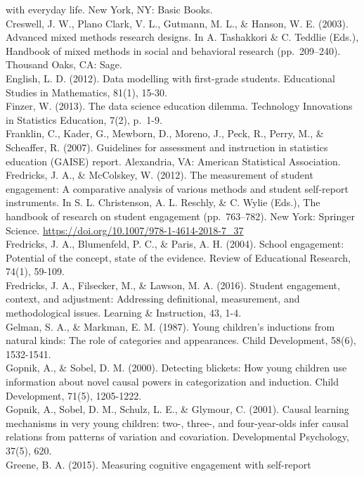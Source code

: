 \documentclass[]{msu-thesis}
\theoremstyle{definition}
\theoremstyle{definition}
\theoremstyle{definition}
\theoremstyle{remark}
\begin{document}
with everyday life. New York, NY: Basic Books.\\
Creswell, J. W., Plano Clark, V. L., Gutmann, M. L., \& Hanson, W. E.
(2003). Advanced mixed methods research designs. In A. Tashakkori \& C.
Teddlie (Eds.), Handbook of mixed methods in social and behavioral
research (pp.~209--240). Thousand Oaks, CA: Sage.\\
English, L. D. (2012). Data modelling with first-grade students.
Educational Studies in Mathematics, 81(1), 15-30.\\
Finzer, W. (2013). The data science education dilemma. Technology
Innovations in Statistics Education, 7(2), p.~1-9.\\
Franklin, C., Kader, G., Mewborn, D., Moreno, J., Peck, R., Perry, M.,
\& Scheaffer, R. (2007). Guidelines for assessment and instruction in
statistics education (GAISE) report. Alexandria, VA: American
Statistical Association.\\
Fredricks, J. A., \& McColskey, W. (2012). The measurement of student
engagement: A comparative analysis of various methods and student
self-report instruments. In S. L. Christenson, A. L. Reschly, \& C.
Wylie (Eds.), The handbook of research on student engagement
(pp.~763--782). New York: Springer Science.
\url{https://doi.org/10.1007/978-1-4614-2018-7_37}\\
Fredricks, J. A., Blumenfeld, P. C., \& Paris, A. H. (2004). School
engagement: Potential of the concept, state of the evidence. Review of
Educational Research, 74(1), 59-109.\\
Fredricks, J. A., Filsecker, M., \& Lawson, M. A. (2016). Student
engagement, context, and adjustment: Addressing definitional,
measurement, and methodological issues. Learning \& Instruction, 43,
1-4.\\
Gelman, S. A., \& Markman, E. M. (1987). Young children's inductions
from natural kinds: The role of categories and appearances. Child
Development, 58(6), 1532-1541.\\
Gopnik, A., \& Sobel, D. M. (2000). Detecting blickets: How young
children use information about novel causal powers in categorization and
induction. Child Development, 71(5), 1205-1222.\\
Gopnik, A., Sobel, D. M., Schulz, L. E., \& Glymour, C. (2001). Causal
learning mechanisms in very young children: two-, three-, and
four-year-olds infer causal relations from patterns of variation and
covariation. Developmental Psychology, 37(5), 620.\\
Greene, B. A. (2015). Measuring cognitive engagement with self-report
\end{document}
